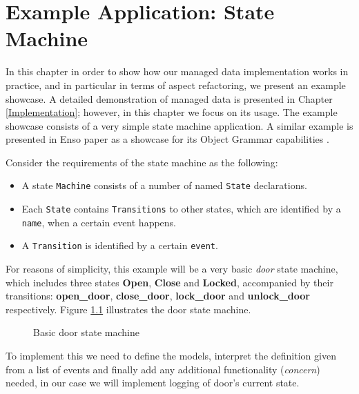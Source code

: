 
\chapter{Example Application: State Machine}\label{Example Application}
In this chapter in order to show how our managed data implementation works in practice, and in particular in terms of aspect refactoring, we present an example showcase.
A detailed demonstration of managed data is presented in Chapter \ref{Implementation}; however, in this chapter we focus on its usage.
The example showcase consists of a very simple state machine application.
A similar example is presented in Enso paper as a showcase for its Object Grammar capabilities \cite{storm2012object}.

Consider the requirements of the state machine as the following: 
\begin{itemize}
	\item A state \texttt{Machine} consists of a number of named \texttt{State} declarations.

	\item Each \texttt{State} contains \texttt{Transitions} to other states, which are identified by a \texttt{name}, when a certain event happens.

	\item A \texttt{Transition} is identified by a certain \texttt{event}.
\end{itemize}

For reasons of simplicity, this example will be a very basic \textit{door} state machine, which includes three states \textbf{Open}, \textbf{Close} and \textbf{Locked}, accompanied by their transitions: \textbf{open\_door}, \textbf{close\_door}, \textbf{lock\_door} and \textbf{unlock\_door} respectively.
Figure \ref{fig:State_machine} illustrates the door state machine.

\begin{figure}[H]
	\centering
  	\caption{Basic door state machine}
  	\label{fig:State_machine}
\end{figure}

To implement this we need to define the models, interpret the definition given from a list of events and finally add any additional functionality (\textit{concern}) needed, in our case we will implement logging of door's current state.


